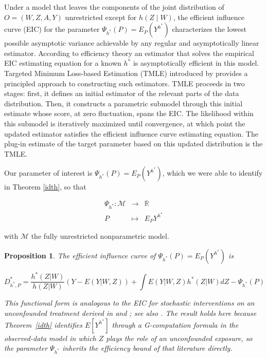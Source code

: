 \documentclass[12pt]{article}
\theoremstyle{thmstyleone}%
\newtheorem{propo}[theo]{Proposition}%
\theoremstyle{thmstyletwo}%
\theoremstyle{thmstylethree}%
\begin{document}
Under a model that leaves the components of the joint distribution of $O = (W, Z, A, Y)$ unrestricted except for $h(Z \mid W)$, the efficient influence curve (EIC) for the parameter $\Psi_{h^*}(P)=E_P(Y^{h^*})$ characterizes the lowest possible asymptotic variance achievable by any regular and asymptotically linear estimator. According to efficiency theory \citep{bickel1993efficient} an estimator that solves the empirical EIC estimating equation for a known $h^*$ is asymptotically efficient in this model. Targeted Minimum Loss-based Estimation (TMLE) introduced by \citep{vandrlrubin2006} provides a principled approach to constructing such estimators. TMLE proceeds in two stages: first, it defines an initial estimator of the relevant parts of the data distribution. Then, it constructs a parametric submodel through this initial estimate whose score, at zero fluctuation, spans the EIC. The likelihood within this submodel is iteratively maximized until convergence, at which point the updated estimator satisfies the efficient influence curve estimating equation. The plug-in estimate of the target parameter based on this updated distribution is the TMLE. 

Our parameter of interest is $\Psi_{h^*}(P) = E_P(Y^{h^*})$, which we were able to identify in Theorem \ref{idth}, so that

\[
\begin{array}{rcl}
	\Psi_{h^*} : 	\mathcal{M} & \longrightarrow & \mathbb{R} \\
	P & \mapsto & E_P Y^{h^*}
\end{array}
\]

with $\mathcal{M}$ the fully unrestricted nonparametric model. 

\begin{propo}\label{prop:eic}
	The efficient influence curve of $\Psi_{h^*}(P) = E_P(Y^{h^*})$ is

	$$D^*_{h^*,P} = \frac{h^*(Z|W)}{h(Z|W)}(Y - E(Y|W,Z)) + \int E(Y|W,Z) h^*(Z|W)dZ - \Psi_{h^*}(P) $$

	 {This functional form is analogous to the EIC for stochastic interventions on an unconfounded treatment derived in \citet{munoz2012population} and \citet{diaz2013assessing}; see also \citet{diaz2020causal}. The result holds here because Theorem~\ref{idth} identifies $E[Y^{h^*}]$ through a G-computation formula in the observed-data model in which $Z$ plays the role of an unconfounded exposure, so the parameter $\Psi_{h^*}$ inherits the efficiency bound of that literature directly.}
\end{propo}
\end{document}
